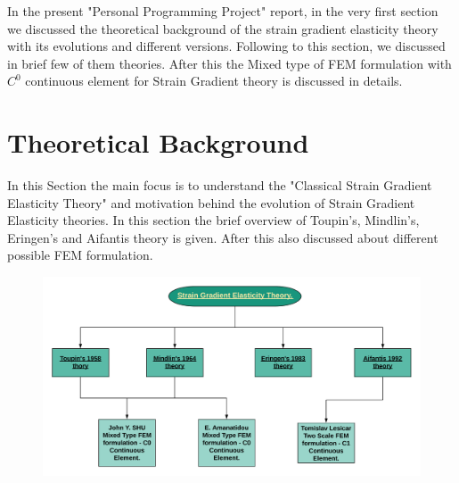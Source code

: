 \documentclass[12pt]{article}
\begin{document}
\newline  
\par
In the present "Personal Programming Project" report, in the very first section we discussed the theoretical background of the strain gradient elasticity theory with its evolutions and different versions. Following to this section, we discussed in brief few of them theories. After this the Mixed type of FEM formulation with $C^{0}$ continuous element for Strain Gradient theory is discussed in details.
\newpage
 
\section{Theoretical Background}
In this Section the main focus is to understand the "Classical Strain Gradient Elasticity Theory" and motivation behind the evolution of Strain Gradient Elasticity theories. In this section the brief overview of Toupin's, Mindlin's, Eringen's and Aifantis theory is given. After this also discussed about different possible FEM formulation.  
     \begin{figure}[H]
     	\includegraphics[scale=0.6]{file.png}  
     \end{figure}
\end{document}
